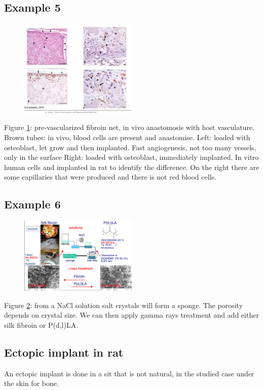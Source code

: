 \subsection{Example 5}
\begin{figure}[h]
\centering
\includegraphics[width=0.5\textwidth]{osteoblast}
\caption{\label{fig:osteoblast}}
\end{figure}
Figure \ref{fig:osteoblast}: pre-vascularized fibroin net, in vivo anastomosis with host vasculature.
Brown tubes: in vivo, blood cells are present and anastomise.
Left: loaded with osteoblast, let grow and then implanted. Fast angiogenesis, not too many vessels, only in the surface
Right: loaded with osteoblast, immediately implanted.
In vitro human cells and implanted in rat to identify the difference. On the right there are some capillaries that were produced and there is not red blood cells.

\subsection{Example 6}
\begin{figure}[h]
\centering
\includegraphics[width=0.5\textwidth]{salt}
\caption{\label{fig:salt}}
\end{figure}
Figure \ref{fig:salt}: from a NaCl solution salt crystals will form a sponge. The porosity depends on crystal size. We can then apply gamma rays treatment and add either silk fibroin or P(d,l)LA.


    \subsection{Ectopic implant in rat}
    An ectopic implant is done in a sit that is not natural, in the studied case under the skin for bone.


